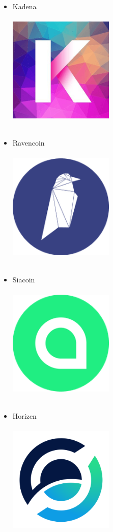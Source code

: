 \documentclass[ngerman]{scrreprt}
\begin{document}
\begin{itemize}
\begin{itemize}
		\item{Kadena}\\ \\
		\includegraphics[width=5cm,height=5cm]{kadena}\\ \\
		\item{Ravencoin}\\ \\
		\includegraphics[width=5cm,height=5cm]{Ravencoin}\\ \\
		\item{Siacoin}\\ \\
		\includegraphics[width=5cm,height=5cm]{siacoin}\\ \\
		\item{Horizen}\\ \\
		\includegraphics[width=5cm,height=5cm]{horizen}\\ \\

\end{itemize}
\end{itemize}
\end{document}
